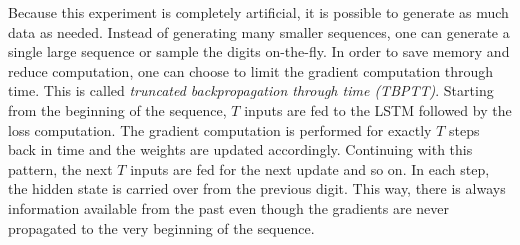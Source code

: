 		
		Because this experiment is completely artificial, it is possible to generate as much data as needed.
		Instead of generating many smaller sequences, one can generate a single large sequence or sample the digits on-the-fly.
		In order to save memory and reduce computation, one can choose to limit the gradient computation through time.
		This is called \emph{truncated backpropagation through time (TBPTT)}. 
		Starting from the beginning of the sequence, $T$ inputs are fed to the LSTM followed by the loss computation.
		The gradient computation is performed for exactly $T$ steps back in time and the weights are updated accordingly. 
		Continuing with this pattern, the next $T$ inputs are fed for the next update and so on.
		In each step, the hidden state is carried over from the previous digit.
		This way, there is always information available from the past even though the gradients are never propagated to the very beginning of the sequence.
		
